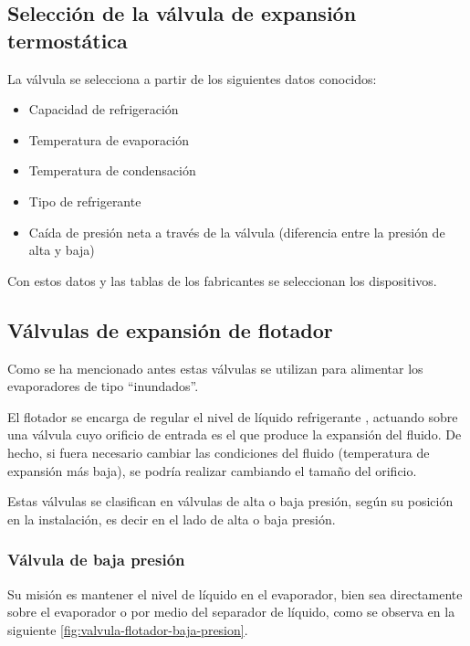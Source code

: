 \subsection{Selección de la v\'alvula de expansi\'on termost\'atica}

La v\'alvula se selecciona a partir de los siguientes datos conocidos:

\begin{itemize}
    \item Capacidad de refrigeraci\'on
    \item Temperatura de evaporaci\'on
    \item Temperatura de condensaci\'on
    \item Tipo de refrigerante
    \item Ca\'ida de presi\'on neta a trav\'es de la v\'alvula (diferencia entre la presi\'on de alta y baja)
\end{itemize}

Con estos datos y las tablas de los fabricantes se seleccionan los dispositivos.

\subsection{V\'alvulas de expansi\'on de flotador}

Como se ha mencionado antes estas v\'alvulas se utilizan para alimentar los evaporadores de tipo ``inundados''.

El flotador se encarga de regular el nivel de l\'iquido refrigerante , actuando sobre una v\'alvula cuyo orificio de entrada es el que produce la expansi\'on del fluido. De hecho, si fuera necesario cambiar las condiciones del fluido (temperatura de expansi\'on m\'as baja), se podr\'ia realizar cambiando el tamaño del orificio. 

Estas v\'alvulas se clasifican en v\'alvulas de alta o baja presi\'on, seg\'un su posici\'on en la instalaci\'on, es decir en el lado de alta o baja presi\'on.

\subsubsection{V\'alvula de baja presi\'on}

Su misi\'on es mantener el nivel de l\'iquido en el evaporador, bien sea directamente sobre el evaporador o por medio del separador de l\'iquido, como se observa en la siguiente \autoref{fig:valvula-flotador-baja-presion}.

